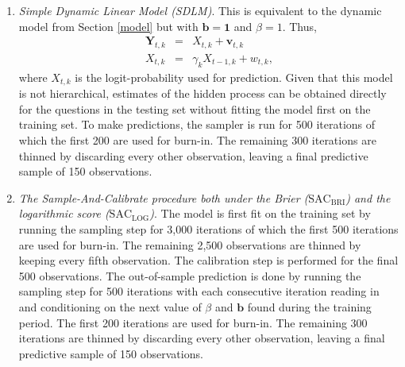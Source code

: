 \documentclass[aoas, preprint]{imsart}
\numberwithin{equation}{section}
\theoremstyle{plain}
\begin{document}
\begin{enumerate}
\item \textit{Simple Dynamic Linear Model (SDLM)}. This is equivalent to the dynamic model from Section \ref{model} but with $\boldsymbol{b} = \boldsymbol{1}$ and $\beta = 1$. Thus,
\begin{eqnarray*}
\boldsymbol{Y}_{t, k} &=&  X_{t, k} + \boldsymbol{v}_{t, k}  \\
X_{t, k} &=& \gamma_k X_{t-1, k} + w_{t, k},
\end{eqnarray*}
where $X_{t,k}$ is the logit-probability used for prediction. Given that this model is not hierarchical, estimates of the hidden process can be obtained directly for the questions in the testing set without fitting the model first on the training set. To make predictions, the sampler is run for 500 iterations of which the first 200 are used for burn-in. The remaining 300 iterations are thinned by discarding every other observation, leaving a final predictive sample of 150 observations. 

\item \textit{The Sample-And-Calibrate procedure both under the Brier ($\text{SAC}_{\text{BRI}}$) and the logarithmic score ($\text{SAC}_{\text{LOG}}$)}. The model is first fit on the training set by running the sampling step for 3,000 iterations of which the first 500 iterations are used for burn-in. The remaining 2,500 observations are thinned by keeping every fifth observation. The calibration step is performed for the final 500 observations. The out-of-sample prediction is done by running the sampling step for 500 iterations with each consecutive iteration reading in and conditioning on the next value of $\beta$ and $\boldsymbol{b}$ found during the training period. The first 200 iterations are used for burn-in. The remaining 300 iterations are thinned by discarding every other observation, leaving a final predictive sample of 150 observations. 



\end{enumerate}
\end{document}
